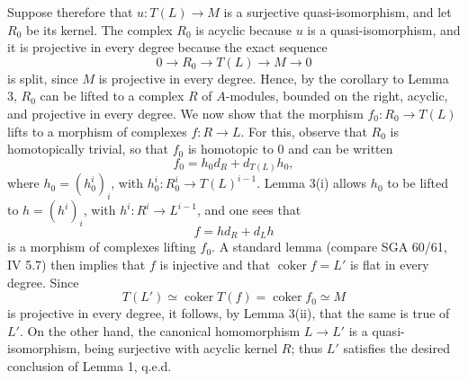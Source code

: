 \documentclass[11pt]{article}
\providecommand{\coker}{\operatorname{coker}}
\providecommand{\coker}{\operatorname{Coker}}
\begin{document}
Suppose therefore that $u:T(L)\to M$ is a surjective quasi-isomorphism, and let $R_0$ be its kernel. The complex $R_0$ is acyclic because $u$ is a quasi-isomorphism, and it is projective in every degree because the exact sequence
\[
0\longrightarrow R_0\longrightarrow T(L)\longrightarrow M\longrightarrow0
\]
is split, since $M$ is projective in every degree. Hence, by the corollary to Lemma 3, $R_0$ can be lifted to a complex $R$ of $A$-modules, bounded on the right, acyclic, and projective in every degree. We now show that the morphism $f_0:R_0\to T(L)$ lifts to a morphism of complexes $f:R\to L$. For this, observe that $R_0$ is homotopically trivial, so that $f_0$ is homotopic to $0$ and can be written
\[
f_0=h_0d_R+d_{T(L)}h_0,
\]
where $h_0=(h_0^i)_i$, with $h_0^i:R_0^i\to T(L)^{i-1}$. Lemma 3(i) allows $h_0$ to be lifted to $h=(h^i)_i$, with $h^i:R^i\to L^{i-1}$, and one sees that
\[
f=hd_R+d_Lh
\]
is a morphism of complexes lifting $f_0$. A standard lemma (compare SGA 60/61, IV 5.7) then implies that $f$ is injective and that $\coker f=L'$ is flat in every degree. Since
\[
T(L')\simeq\coker T(f)=\coker f_0\simeq M
\]
is projective in every degree, it follows, by Lemma 3(ii), that the same is true of $L'$. On the other hand, the canonical homomorphism $L\to L'$ is a quasi-isomorphism, being surjective with acyclic kernel $R$; thus $L'$ satisfies the desired conclusion of Lemma 1, q.e.d.
\end{document}
